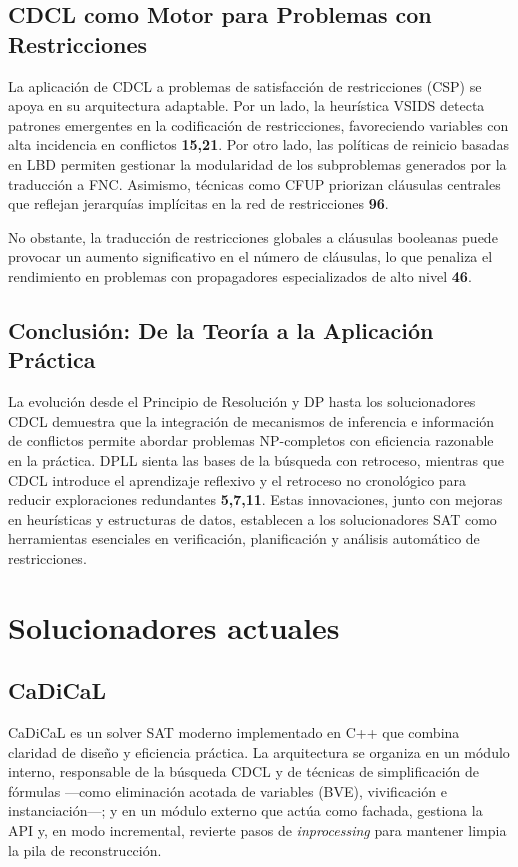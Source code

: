 \subsection{CDCL como Motor para Problemas con Restricciones}
\label{subsec:cdcl-csp}

La aplicación de CDCL a problemas de satisfacción de restricciones (CSP) se apoya en su arquitectura adaptable. Por un lado, la heurística VSIDS detecta patrones emergentes en la codificación de restricciones, favoreciendo variables con alta incidencia en conflictos \textbf{15,21}. Por otro lado, las políticas de reinicio basadas en LBD permiten gestionar la modularidad de los subproblemas generados por la traducción a FNC. Asimismo, técnicas como CFUP priorizan cláusulas centrales que reflejan jerarquías implícitas en la red de restricciones \textbf{96}.  

No obstante, la traducción de restricciones globales a cláusulas booleanas puede provocar un aumento significativo en el número de cláusulas, lo que penaliza el rendimiento en problemas con propagadores especializados de alto nivel \textbf{46}.

\subsection{Conclusión: De la Teoría a la Aplicación Práctica}
La evolución desde el Principio de Resolución y DP hasta los solucionadores CDCL demuestra que la integración de mecanismos de inferencia e información de conflictos permite abordar problemas NP-completos con eficiencia razonable en la práctica. DPLL sienta las bases de la búsqueda con retroceso, mientras que CDCL introduce el aprendizaje reflexivo y el retroceso no cronológico para reducir exploraciones redundantes \textbf{5,7,11}. Estas innovaciones, junto con mejoras en heurísticas y estructuras de datos, establecen a los solucionadores SAT como herramientas esenciales en verificación, planificación y análisis automático de restricciones.

\section{Solucionadores actuales}

\subsection{CaDiCaL}
CaDiCaL es un solver SAT moderno implementado en C++ que combina claridad de diseño y eficiencia práctica. La arquitectura se organiza en un módulo interno, responsable de la búsqueda CDCL y de técnicas de simplificación de fórmulas —como eliminación acotada de variables (BVE), vivificación e instanciación—; y en un módulo externo que actúa como fachada, gestiona la API y, en modo incremental, revierte pasos de \textit{inprocessing} para mantener limpia la pila de reconstrucción.

